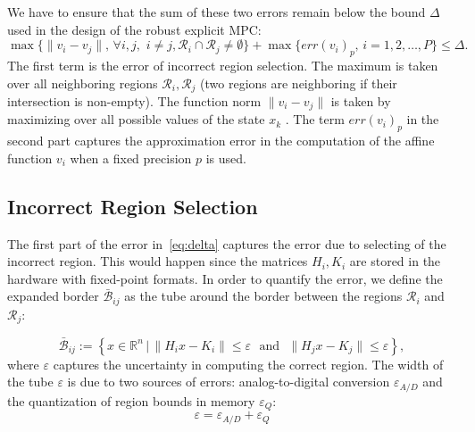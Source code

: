 We have to ensure that the sum of these two errors remain below the bound $\Delta$
used in the design of the robust explicit MPC:
\begin{equation}
  \max\{\|v_{i}-v_{j}\|,\,\forall i,j,\,\, i\neq j, \mathcal{R}_{i}\cap\mathcal{R}_{j}\neq\emptyset\} +  \max\{\mathit{err}(v_{i})_{p},\, i=1,2,\ldots,P\} \le \Delta.
  \label{eq:delta}
\end{equation}
The first term is the error of incorrect region selection. The maximum is taken over all neighboring regions 
$\mathcal R_i,\mathcal R_j$ (two regions are neighboring if their intersection is non-empty).
The function norm $\|v_{i}-v_{j}\|$ is taken by maximizing over all possible values of the state $x_k$ . 
The term $\mathit{err}(v_{i})_{p}$ in
the second part captures the approximation error in the computation of the affine function $v_{i}$ when a fixed precision $p$ is used.

\subsection{Incorrect Region Selection}

The first part of the error in~\autoref{eq:delta} captures the error due to
selecting of the incorrect region.
This would happen since the matrices $H_i,K_i$ are stored in the hardware with fixed-point formats. In order to quantify the error, we define the expanded border $\bar{\mathcal B}_{ij}$ as the tube around the border between the regions $\mathcal{R}_i$ and $\mathcal{R}_j$:

\begin{equation*}
\bar{\mathcal B}_{ij} := \left\{x\in\mathbb R^n\,|\, \| H_i x - K_i\| \le \varepsilon\,\, \text{ and }\,\, \| H_j x - K_j\| \le \varepsilon \right\},
\end{equation*}
where $\varepsilon$ captures the uncertainty in computing the correct region.
%
The width of the tube $\varepsilon$ is due to two sources of errors:
analog-to-digital conversion $\varepsilon_{A/D}$ and the quantization of region
bounds in memory $\varepsilon_{Q}$:
\begin{equation}\label{eq:epsilontot}
  \varepsilon=\varepsilon_{A/D}+\varepsilon_{Q}
\end{equation}

